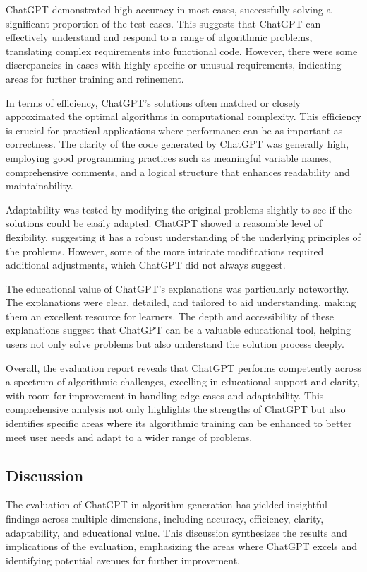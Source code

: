\documentclass{article}
\begin{document}
ChatGPT demonstrated high accuracy in most cases, successfully solving a significant proportion of the test cases. This suggests that ChatGPT can effectively understand and respond to a range of algorithmic problems, translating complex requirements into functional code. However, there were some discrepancies in cases with highly specific or unusual requirements, indicating areas for further training and refinement.

In terms of efficiency, ChatGPT’s solutions often matched or closely approximated the optimal algorithms in computational complexity. This efficiency is crucial for practical applications where performance can be as important as correctness. The clarity of the code generated by ChatGPT was generally high, employing good programming practices such as meaningful variable names, comprehensive comments, and a logical structure that enhances readability and maintainability.

Adaptability was tested by modifying the original problems slightly to see if the solutions could be easily adapted. ChatGPT showed a reasonable level of flexibility, suggesting it has a robust understanding of the underlying principles of the problems. However, some of the more intricate modifications required additional adjustments, which ChatGPT did not always suggest.

The educational value of ChatGPT’s explanations was particularly noteworthy. The explanations were clear, detailed, and tailored to aid understanding, making them an excellent resource for learners. The depth and accessibility of these explanations suggest that ChatGPT can be a valuable educational tool, helping users not only solve problems but also understand the solution process deeply.

Overall, the evaluation report reveals that ChatGPT performs competently across a spectrum of algorithmic challenges, excelling in educational support and clarity, with room for improvement in handling edge cases and adaptability. This comprehensive analysis not only highlights the strengths of ChatGPT but also identifies specific areas where its algorithmic training can be enhanced to better meet user needs and adapt to a wider range of problems.


\subsection{Discussion}
The evaluation of ChatGPT in algorithm generation has yielded insightful findings across multiple dimensions, including accuracy, efficiency, clarity, adaptability, and educational value. This discussion synthesizes the results and implications of the evaluation, emphasizing the areas where ChatGPT excels and identifying potential avenues for further improvement.
\end{document}
